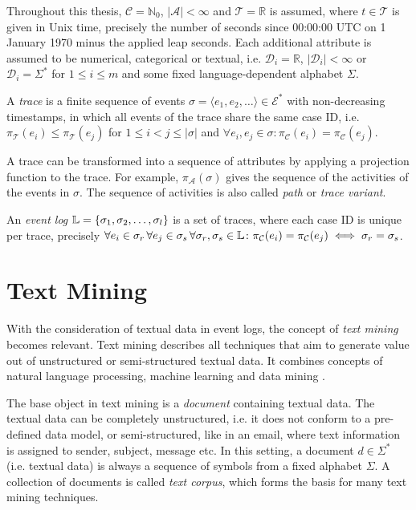 Throughout this thesis,  $\mathcal{C} = \mathbb{N}_0$, $|\mathcal{A}| < \infty$ and $ \mathcal{T} = \mathbb{R}$ is assumed, where $t \in \mathcal{T}$ is given in Unix time, precisely the number of seconds since 00:00:00 UTC on 1 January 1970 minus the applied leap seconds.
Each additional attribute is assumed to be numerical, categorical or textual, i.e. $\mathcal{D}_i = \mathbb{R}$, $|\mathcal{D}_i| < \infty$ or $\mathcal{D}_i = \Sigma^\ast$  for $1 \leq i \leq m$ and some fixed language-dependent alphabet $\Sigma$.
\begin{definition}[Trace]
	A \textit{trace} is a finite sequence of events $\sigma = \langle e_1, e_2, \dots\rangle \in  \mathcal{E}^\ast$ with non-decreasing timestamps, in which all events of the trace share the same case ID, i.e. $\pi_\mathcal{T} (e_i) \leq \pi_\mathcal{T} (e_j) $ for $1 \leq i < j \leq |\sigma|$ and $\forall e_i, e_j \in \sigma \colon \pi_\mathcal{C}(e_i) =  \pi_\mathcal{C}(e_j)$.
\end{definition}
A trace can be transformed into a sequence of attributes by applying a projection function to the trace.
For example, $\pi_\mathcal{A}(\sigma)$ gives the sequence of the activities of the events in $\sigma$.
The sequence of activities is also called \textit{path} or \textit{trace variant}.
\begin{definition}
	An \textit{event log} $\mathbb{L} = \{ \sigma_1, \sigma _2, \dots, \sigma_l \}$ is a set of traces, where each case ID is unique per trace, precisely $\forall e_i \in \sigma_r \,  \forall e_j \in \sigma_s \, \forall  \sigma_r, \sigma_s \in \mathbb{L} \colon \pi_\mathcal{C}(e_i) = \pi_\mathcal{C}(e_j) \iff \sigma_r = \sigma_s$.
\end{definition}

\section{Text Mining}

With the consideration of textual data in event logs, the concept of \textit{text mining} becomes relevant.
Text mining describes all techniques that aim to generate value out of unstructured or semi-structured textual data.
It combines concepts of natural language processing, machine learning and data mining \cite{DBLP:books/daglib/0022577}.

The base object in text mining is a \textit{document} containing textual data.
The textual data can be completely unstructured, i.e. it does not conform to a pre-defined data model, or semi-structured, like in an email, where text information is assigned to sender, subject, message etc.
In this setting, a document $d \in \Sigma^*$ (i.e. textual data) is always a sequence of symbols from a fixed alphabet $\Sigma$.
A collection of documents is called \textit{text corpus}, which forms the basis for many text mining techniques.

